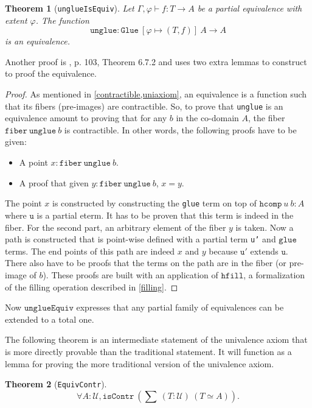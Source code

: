 \documentclass[12pt,a4paper,twoside,xetex]{book} %
\newtheorem{theorem}{Theorem}[section]
\newcommand{\op}[1]{\mathtt{#1}}
\newcommand{\type}{\mathcal{U}}
\begin{document}
\begin{theorem}[\texttt{unglueIsEquiv}]
Let $\Gamma, \varphi \vdash f : T \rightarrow A$ be a partial equivalence with 
extent $\varphi$. The function $$ \op{unglue} : \op{Glue} \ \left[\varphi 
\mapsto (T,f) \right] \ A \rightarrow A$$ is an equivalence. 
\end{theorem}

Another proof is \cite{Huber2016}, p. 103, Theorem 6.7.2 and uses two extra 
lemmas to construct to proof the equivalence.

\begin{proof}
As mentioned in \cref{contractible,uniaxiom}, an equivalence is a function such 
that its fibers (pre-images) are contractible. So, to prove that 
\texttt{unglue} is an equivalence amount to proving that for any $b$ in the 
co-domain $A$, the fiber $\op{fiber}\ \op{unglue} \ b$ is contractible. In 
other words, the following proofs have to be given:
\begin{itemize}
\item A point  $x : \op{fiber}\ \op{unglue} \ b$. 
\item A proof that given $y : \op{fiber}\ \op{unglue} \ b$, $x = y$. 
\end{itemize}
The point $x$ is constructed by constructing the \texttt{glue} term on top of 
$\texttt{hcomp} \ u \ b : A$ where $\op{u}$ is a partial eterm. It has to be 
proven that this term is indeed in the fiber. For the second part, an arbitrary 
element of the fiber $y$ is taken. Now a path is constructed that is point-wise 
defined with a partial term \texttt{u'} and $\op{glue}$ terms. The end points 
of this path are indeed $x$ and $y$ because $\op{u'}$ extends $\op{u}$. There 
also have to be proofs that the terms on the path are in the fiber (or 
pre-image of $b$). These proofs are built with an application of $\op{hfill}$, 
a formalization of the filling operation described in \cref{filling}.
\end{proof}

Now $\op{unglueEquiv}$  expresses that any partial family of equivalences can 
be extended to a total one.

The following theorem is an intermediate statement of the univalence axiom that 
is more directly provable than the traditional statement. It will function as a 
lemma for proving the more traditional version of the univalence axiom.

\begin{theorem}[\texttt{EquivContr}]\label{contrSingl}
 $$\forall A : \type, \op{isContr} \ \left( \sum \ (T : \type) \  \left( T 
\simeq A \right) \right).$$ 
\end{theorem}
\end{document}
